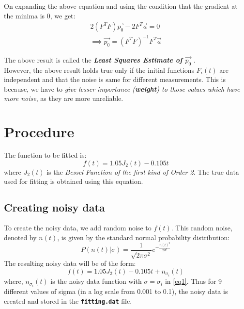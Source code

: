 \documentclass[11pt, a4paper]{article}
\begin{document}
        On expanding the above equation and using the condition that the gradient at the minima is 0, we get:\\
        \begin{equation}
            \begin{aligned}
                2(F^TF)\vec{p_0} - 2F^T\vec{a} = 0\\
                \implies \vec{p_0} = (F^TF)^{-1}F^T\vec{a}
            \end{aligned}
        \end{equation}

        The above result is called the \textbf{\textit{Least Squares Estimate of $\vec{p_0}$ }}.\\

        However, the above result holds true only if the initial functions $F_i(t)$ are independent and that the noise is same for different measurements. This is because, we have to \textit{give lesser importance (\textbf{weight}) to those values which have more noise}, as they are more unreliable.

    \section{Procedure}
        The function to be fitted is:
        \begin{equation}
            f(t) = 1.05J_2(t)-0.105t
        \end{equation}
        where $J_2(t)$ is the \textit{Bessel Function of the first kind of Order 2}. The true data used for fitting is obtained using this equation.

        \subsection{Creating noisy data}
            To create the noisy data, we add random noise to $f(t)$. This random noise, denoted by $n(t)$, is given by the standard normal probability distribution:
            \begin{equation}
                P(n(t)|\sigma)=\frac{1}{\sqrt{2\pi\sigma^2}}e^{-\frac{n(t)^2}{2\sigma^2}} \label{eq1}
            \end{equation}
            The resulting noisy data will be of the form:
            \begin{equation}
                f(t) = 1.05J_2(t)-0.105t+n_{\sigma_i}(t)
            \end{equation}
            where, $n_{\sigma_i}(t)$ is the noisy data function with $\sigma = \sigma_{i}$ in \eqref{eq1}. Thus for 9 different values of sigma (in a log scale from 0.001 to 0.1), the noisy data is created and stored in the \texttt{\textbf{fitting.dat}} file.
\end{document}
